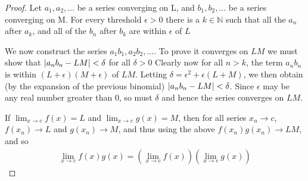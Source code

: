 \documentclass{article}
\DeclarePairedDelimiter\abs{\lvert}{\rvert}%
\theoremstyle{remark}
\begin{document}
\begin{proof}
Let $a_1, a_2,...$ be a series converging on L, and $b_1, b_2,...$ be a series converging on M. For every threshold $\epsilon > 0$ there is a $k \in \mathbb{N}$ such that all the $a_n$ after $a_k$, and all of the $b_n$ after $b_k$ are within $\epsilon$ of $L$

We now construct the series $a_1b_1,a_2b_2,...$. To prove it converges on $LM$ we must show that $\abs{a_nb_n - LM} < \delta$ for all $\delta > 0$ Clearly now for all $n>k$, the term $a_nb_n$ is within $(L+\epsilon)(M+\epsilon)$ of $LM$. Letting $\delta = \epsilon^2+\epsilon(L+M)$, we then obtain (by the expansion of the previous binomial) $\abs{a_nb_n - LM} < \delta$. Since $\epsilon$ may be any real number greater than 0, so must $\delta$ and hence the series converges on $LM$.

If $\lim_{x \to c} f(x) = L$ and $\lim_{x \to c} g(x) = M$, then for all series $x_n \rightarrow c$, $f(x_n) \rightarrow L$ and $g(x_n) \rightarrow M$, and thus using the above $f(x_n)g(x_n) \rightarrow LM$, and so
\[
\begin{aligned}
\lim_{x \to c} f(x)g(x) = (\lim_{x \to c} f(x))(\lim_{x \to c} g(x))
\end{aligned}
\]
\end{proof}
\end{document}
